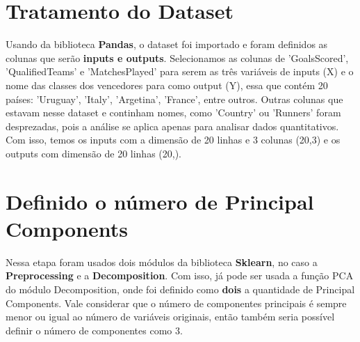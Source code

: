 \documentclass{article}
\begin{document}
\section*{Tratamento do Dataset}
\begin{flushleft}
    Usando da biblioteca \textbf{Pandas}, o dataset foi importado e foram definidos as colunas que serão \textbf{inputs e outputs}. Selecionamos as colunas de 'GoalsScored', 'QualifiedTeams' e 'MatchesPlayed' para serem as três variáveis de inputs (X) e o nome das classes dos vencedores para como output (Y), essa que contém 20 países: 'Uruguay', 'Italy', 'Argetina', 'France', entre outros.
    \newline
    Outras colunas que estavam nesse dataset e continham nomes, como 'Country' ou 'Runners' foram desprezadas, pois a análise se aplica apenas para analisar dados quantitativos.
    \newline
    Com isso, temos os inputs com a dimensão de 20 linhas e 3 colunas (20,3) e os outputs com dimensão de 20 linhas (20,).
\end{flushleft}

\section*{Definido o número de Principal Components}
\begin{flushleft}
    Nessa etapa foram usados dois módulos da biblioteca \textbf{Sklearn}, no caso a \textbf{Preprocessing} e a \textbf{Decomposition}. Com isso, já pode ser usada a função PCA do módulo Decomposition, onde foi definido como \textbf{dois} a quantidade de Principal Components. 
    \newline
    Vale considerar que o número de componentes principais é sempre menor ou igual ao número de variáveis originais, então também seria possível definir o número de componentes como 3.
\end{flushleft}
\end{document}
